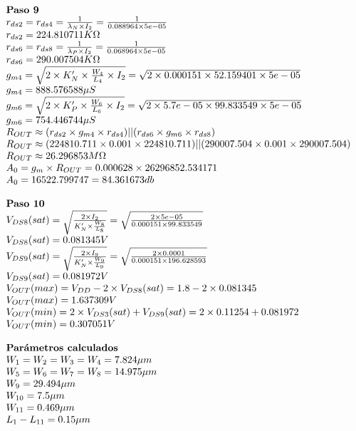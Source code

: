 \begin{equation*}
	\begin{array}{l l}
		\textbf{Paso 9} \\
		r_{ds2} = r_{ds4} = \frac{1}{\lambda_{N}\times I_{2}} = \frac{1}{ 0.088964 \times 5e-05 } \\
		r_{ds2} =  224.810711  K\Omega \\
		r_{ds6} = r_{ds8} = \frac{1}{\lambda_{P}\times I_{2}} = \frac{1}{ 0.068964 \times 5e-05 } \\
		r_{ds6} =  290.007504  K\Omega \\
		g_{m4} = \sqrt{2\times K'_{N}\times \frac{W_4}{L_4}\times I_{2}} = \sqrt{2\times 0.000151 \times 52.159401 \times 5e-05 } \\
		g_{m4} =  888.576588  \mu S \\
		g_{m6} = \sqrt{2\times K'_{P}\times \frac{W_6}{L_6}\times I_{2}} = \sqrt{2\times 5.7e-05 \times 99.833549 \times 5e-05 } \\
		g_{m6} =  754.446744  \mu S \\
		R_{OUT} \approx (r_{ds2}\times g_{m4}\times r_{ds4})||(r_{ds6}\times g_{m6}\times r_{ds8}) \\
		R_{OUT} \approx ( 224810.711 \times 0.001 \times 224810.711 )||( 290007.504 \times 0.001 \times 290007.504 ) \\
		R_{OUT} \approx  26.296853  M\Omega \\
		A_{0} = g_{m}\times R_{OUT} =  0.000628 \times 26296852.534171  \\
		A_{0} =  16522.799747  =  84.361673  db \\
		\\
		\textbf{Paso 10} \\
		V_{DS8}(sat) = \sqrt{\frac{2\times I_{2}}{K'_{N}\times\frac{W_{8}}{L_{8}}}} = \sqrt{\frac{2\times 5e-05 }{ 0.000151 \times 99.833549 }} \\
		V_{DS8}(sat) =  0.081345  V \\
		V_{DS9}(sat) = \sqrt{\frac{2\times I_{9}}{K'_{N}\times\frac{W_{9}}{L_{9}}}} = \sqrt{\frac{2\times 0.0001 }{ 0.000151 \times 196.628593 }} \\
		V_{DS9}(sat) =  0.081972  V \\
		V_{OUT}(max) = V_{DD} - 2\times V_{DS8}(sat) =  1.8 - 2\times  0.081345  \\
		V_{OUT}(max) =  1.637309  V \\
		V_{OUT}(min) = 2\times V_{DS3}(sat) + V_{DS9}(sat) = 2\times  0.11254  +  0.081972  \\
		V_{OUT}(min) =  0.307051  V \\
		\\
		\textbf{Parámetros calculados} \\
		W_{1} = W_{2} = W_{3} = W_{4} =  7.824  \mu m \\
		W_{5} = W_{6} = W_{7} = W_{8} =  14.975  \mu m \\
		W_{9} =  29.494  \mu m \\
		W_{10} =  7.5  \mu m \\
		W_{11} =  0.469  \mu m \\
		L_{1} - L_{11} =  0.15  \mu m \\
	\end{array}
\end{equation*}
